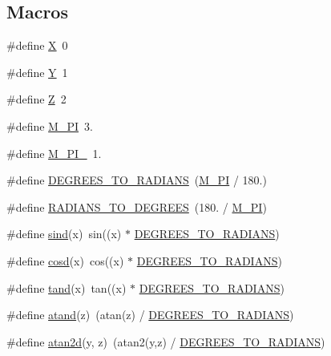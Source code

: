 \subsection*{Macros}
\begin{DoxyCompactItemize}
\item 
\#define \hyperlink{cxform-manual_8c_a207fd5507206d307cd63f95374fcd00d}{X}~0
\item 
\#define \hyperlink{cxform-manual_8c_a798e4073d613ca5ba9618e1b3253df14}{Y}~1
\item 
\#define \hyperlink{cxform-manual_8c_a51591cf51bdd6c1f6015532422e7770e}{Z}~2
\item 
\#define \hyperlink{cxform-manual_8c_ae71449b1cc6e6250b91f539153a7a0d3}{M\-\_\-\-P\-I}~3.
\item 
\#define \hyperlink{cxform-manual_8c_a958e4508ed28ee5cc04249144312c15f}{M\-\_\-\-P\-I\-\_}~1.
\item 
\#define \hyperlink{cxform-manual_8c_a7bf0b4b8b3cf2f13f25573b3e151ed88}{D\-E\-G\-R\-E\-E\-S\-\_\-\-T\-O\-\_\-\-R\-A\-D\-I\-A\-N\-S}~(\hyperlink{cxform-manual_8c_ae71449b1cc6e6250b91f539153a7a0d3}{M\-\_\-\-P\-I} / 180.)
\item 
\#define \hyperlink{cxform-manual_8c_a5b541253554905891d06cf62dbec1a41}{R\-A\-D\-I\-A\-N\-S\-\_\-\-T\-O\-\_\-\-D\-E\-G\-R\-E\-E\-S}~(180. / \hyperlink{cxform-manual_8c_ae71449b1cc6e6250b91f539153a7a0d3}{M\-\_\-\-P\-I})
\item 
\#define \hyperlink{cxform-manual_8c_ad0827f80a4727ba1e433b37a59b61571}{sind}(x)~sin((x) $\ast$ \hyperlink{cxform-manual_8c_a7bf0b4b8b3cf2f13f25573b3e151ed88}{D\-E\-G\-R\-E\-E\-S\-\_\-\-T\-O\-\_\-\-R\-A\-D\-I\-A\-N\-S})
\item 
\#define \hyperlink{cxform-manual_8c_a1625c90afe10ff713ffaa43a64e137ad}{cosd}(x)~cos((x) $\ast$ \hyperlink{cxform-manual_8c_a7bf0b4b8b3cf2f13f25573b3e151ed88}{D\-E\-G\-R\-E\-E\-S\-\_\-\-T\-O\-\_\-\-R\-A\-D\-I\-A\-N\-S})
\item 
\#define \hyperlink{cxform-manual_8c_a01a862be86e92b083de9bff9c0326769}{tand}(x)~tan((x) $\ast$ \hyperlink{cxform-manual_8c_a7bf0b4b8b3cf2f13f25573b3e151ed88}{D\-E\-G\-R\-E\-E\-S\-\_\-\-T\-O\-\_\-\-R\-A\-D\-I\-A\-N\-S})
\item 
\#define \hyperlink{cxform-manual_8c_a1492dbdecdda75e08ac55191da444983}{atand}(z)~(atan(z) / \hyperlink{cxform-manual_8c_a7bf0b4b8b3cf2f13f25573b3e151ed88}{D\-E\-G\-R\-E\-E\-S\-\_\-\-T\-O\-\_\-\-R\-A\-D\-I\-A\-N\-S})
\item 
\#define \hyperlink{cxform-manual_8c_aebf13cae9acb57875f4671864f5efeda}{atan2d}(y, z)~(atan2(y,z) / \hyperlink{cxform-manual_8c_a7bf0b4b8b3cf2f13f25573b3e151ed88}{D\-E\-G\-R\-E\-E\-S\-\_\-\-T\-O\-\_\-\-R\-A\-D\-I\-A\-N\-S})

\end{DoxyCompactItemize}
